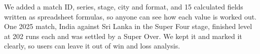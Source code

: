  We added a match ID, series, stage, city and format, and 15 calculated fields written as spreadsheet formulas, so anyone can see how each value is worked out. One 2025 match, India against Sri Lanka in the Super Four stage, finished level at 202 runs each and was settled by a Super Over. We kept it and marked it clearly, so users can leave it out of win and loss analysis.
